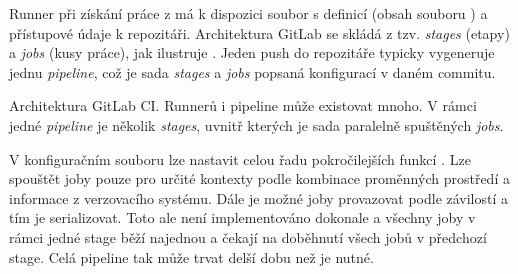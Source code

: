         Runner při získání práce z  má k dispozici soubor s definicí (obsah souboru  \cite{gitlab-runner-yaml}) a přístupové údaje k repozitáři. Architektura GitLab \CI se skládá z tzv. \textit{stages} (etapy) a \textit{jobs} (kusy práce), jak ilustruje . Jeden push do repozitáře typicky vygeneruje jednu \textit{pipeline}, což je sada \textit{stages} a \textit{jobs} popsaná konfigurací \CI v daném commitu.

        \begin{iffigure}
            \centering
            \caption{Architektura GitLab CI. Runnerů i pipeline může existovat mnoho. V rámci jedné \textit{pipeline} je několik \textit{stages}, uvnitř kterých je sada paralelně spuštěných \textit{jobs}.}
            \label{pic:gitlab-ci-architecture}
        \end{iffigure}

        V konfiguračním souboru lze nastavit celou řadu pokročilejších funkcí \cite{gitlab-runner-yaml}. Lze spouštět joby pouze pro určité kontexty podle kombinace proměnných prostředí a informace z verzovacího systému. Dále je možné joby provazovat podle závilostí a tím je serializovat. Toto ale není implementováno dokonale a všechny joby v rámci jedné stage běží najednou a čekají na doběhnutí všech jobů v předchozí stage. Celá pipeline tak může trvat delší dobu než je nutné.

